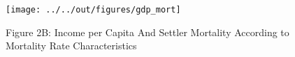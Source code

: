 \documentclass[11pt, a4paper, leqno]{article}
\begin{document}
\begin{figure}[h!]
    \centering
    \texttt{[image: ../../out/figures/gdp\_mort]}
    \caption*{Figure 2B: Income per Capita And Settler Mortality According to Mortality Rate Characteristics}
\end{figure}







\clearpage
{}
\printbibliography
{}

\end{document}
